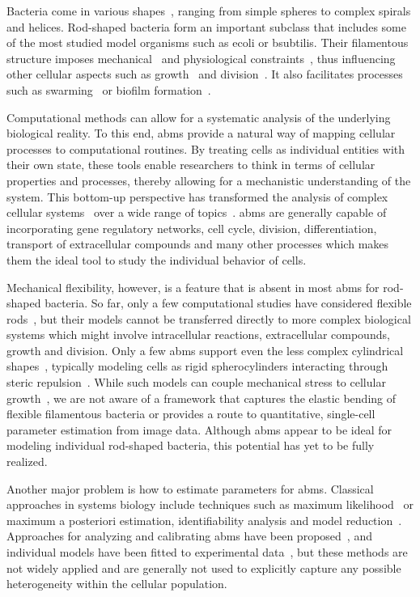 Bacteria come in various shapes~\cite{Young2006,Young2007}, ranging from simple spheres to complex
spirals and helices.
Rod-shaped bacteria form an important subclass that includes some of the most studied model
organisms such as \ac{ecoli} or \ac{bsubtilis}.
Their filamentous structure imposes mechanical~\cite{Daniel2003} and physiological
constraints~\cite{Jones2001}, thus influencing other cellular aspects such as
growth~\cite{Chang2014} and division~\cite{Li2007}.
It also facilitates processes such as swarming~\cite{Harshey1994} or biofilm
formation~\cite{Duvernoy2018}.

Computational methods can allow for a systematic analysis of the underlying biological reality.
To this end, \acp{abm} provide a natural way of mapping cellular processes to computational
routines.
By treating cells as individual entities with their own state, these tools enable researchers to
think in terms of cellular properties and processes, thereby allowing for a mechanistic
understanding of the system.
This bottom-up perspective has transformed the analysis of complex cellular
systems~\cite{Pleyer2023} over a wide range of
topics~\cite{Ghaffarizadeh2018,Cooper2020,Karolak2021,DeRybel2014}.
\acp{abm} are generally capable of incorporating gene regulatory networks, cell cycle, division,
differentiation, transport of extracellular compounds and many other processes which makes them the
ideal tool to study the individual behavior of cells.

Mechanical flexibility, however, is a feature that is absent in most \acp{abm} for rod-shaped
bacteria.
So far, only a few computational studies have considered flexible rods~\cite{Duman2018,Joshi2019},
but their models cannot be transferred directly to more complex biological systems which might
involve intracellular reactions, extracellular compounds, growth and division.
Only a few \acp{abm} support even the less complex cylindrical
shapes~\cite{Rudge2012,Kang2014,Breitwieser2021,Gorochowski2012}, typically modeling cells as rigid
spherocylinders interacting through steric repulsion~\cite{Rudge2012,Winkle2017}.
While such models can couple mechanical stress to cellular growth~\cite{Winkle2017}, we are not
aware of a framework that captures the elastic bending of flexible filamentous bacteria or provides
a route to quantitative, single-cell parameter estimation from image data.
Although \acp{abm} appear to be ideal for modeling individual rod-shaped bacteria, this potential
has yet to be fully realized.

Another major problem is how to estimate parameters for \acp{abm}.
Classical approaches in systems biology include techniques such as maximum
likelihood~\cite{Kreutz2013,Raue2014} or maximum a posteriori estimation, identifiability analysis
and model reduction~\cite{Simpson2025,Gbor2015,Banga2008,Ashyraliyev2009}.
Approaches for analyzing and calibrating \acp{abm} have been proposed~\cite{An2016,Thiele2014},
and individual models have been fitted to experimental data~\cite{Dancik2010,Lima2021}, but these
methods are not widely applied and are generally not used to explicitly capture any possible
heterogeneity within the cellular population.

